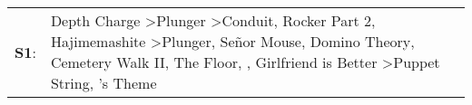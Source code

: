 \begin{supertabular}{p{0.03\textwidth}p{0.92\textwidth}}
 \textbf{S1}:  &  Depth Charge\textsuperscript{} \textgreater \enspace Plunger\textsuperscript{} \textgreater \enspace Conduit\textsuperscript{}, \enspace Rocker Part 2\textsuperscript{}, \enspace Hajimemashite\textsuperscript{} \textgreater \enspace Plunger\textsuperscript{}, \enspace Señor Mouse\textsuperscript{}, \enspace Domino Theory\textsuperscript{}, \enspace Cemetery Walk II\textsuperscript{}, \enspace The Floor\textsuperscript{}, \textsuperscript{}, \enspace Girlfriend is Better\textsuperscript{} \textgreater \enspace Puppet String\textsuperscript{}, 's Theme\textsuperscript{}  \enspace  \\
\end{supertabular}
